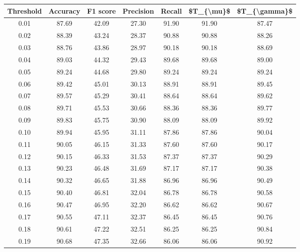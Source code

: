 \begin{tabular}{|c|c|c|c|c|c|c|}
\hline
 Threshold &  Accuracy &  F1 score &  Precision &  Recall &  \$T\_\{\textbackslash mu\}\$ &  \$T\_\{\textbackslash gamma\}\$ \\
\hline
      0.01 &     87.69 &     42.09 &      27.30 &   91.90 &      91.90 &         87.47 \\
      0.02 &     88.39 &     43.24 &      28.37 &   90.88 &      90.88 &         88.26 \\
      0.03 &     88.76 &     43.86 &      28.97 &   90.18 &      90.18 &         88.69 \\
      0.04 &     89.03 &     44.32 &      29.43 &   89.68 &      89.68 &         89.00 \\
      0.05 &     89.24 &     44.68 &      29.80 &   89.24 &      89.24 &         89.24 \\
      0.06 &     89.42 &     45.01 &      30.13 &   88.91 &      88.91 &         89.45 \\
      0.07 &     89.57 &     45.29 &      30.41 &   88.64 &      88.64 &         89.62 \\
      0.08 &     89.71 &     45.53 &      30.66 &   88.36 &      88.36 &         89.77 \\
      0.09 &     89.83 &     45.75 &      30.90 &   88.09 &      88.09 &         89.92 \\
      0.10 &     89.94 &     45.95 &      31.11 &   87.86 &      87.86 &         90.04 \\
      0.11 &     90.05 &     46.15 &      31.33 &   87.60 &      87.60 &         90.17 \\
      0.12 &     90.15 &     46.33 &      31.53 &   87.37 &      87.37 &         90.29 \\
      0.13 &     90.23 &     46.48 &      31.69 &   87.17 &      87.17 &         90.38 \\
      0.14 &     90.32 &     46.65 &      31.88 &   86.96 &      86.96 &         90.49 \\
      0.15 &     90.40 &     46.81 &      32.04 &   86.78 &      86.78 &         90.58 \\
      0.16 &     90.47 &     46.95 &      32.20 &   86.62 &      86.62 &         90.67 \\
      0.17 &     90.55 &     47.11 &      32.37 &   86.45 &      86.45 &         90.76 \\
      0.18 &     90.61 &     47.22 &      32.51 &   86.25 &      86.25 &         90.84 \\
      0.19 &     90.68 &     47.35 &      32.66 &   86.06 &      86.06 &         90.92 \\

\end{tabular}

